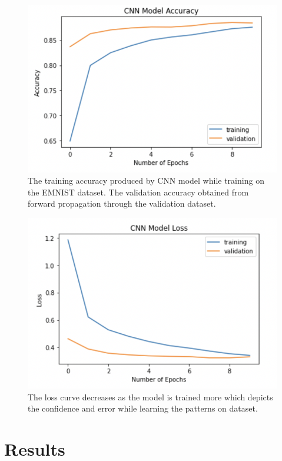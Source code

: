 \documentclass[conference]{IEEEtran}
\begin{document}
\begin{figure}[h!]
\centering
\includegraphics[width=1\linewidth]{images/accuracy.jpg}
\caption{The training accuracy produced by CNN model while training on the EMNIST dataset. The validation accuracy obtained from forward propagation through the validation dataset.}
\label{fig:accuracy}
\end{figure}

\begin{figure}[h!]
\centering
\includegraphics[width=1\linewidth]{images/loss.jpg}
\caption{The loss curve decreases as the model is trained more which depicts the confidence and error while learning the patterns on dataset.}
\label{fig:loss}
\end{figure}

\section{Results}
\end{document}
